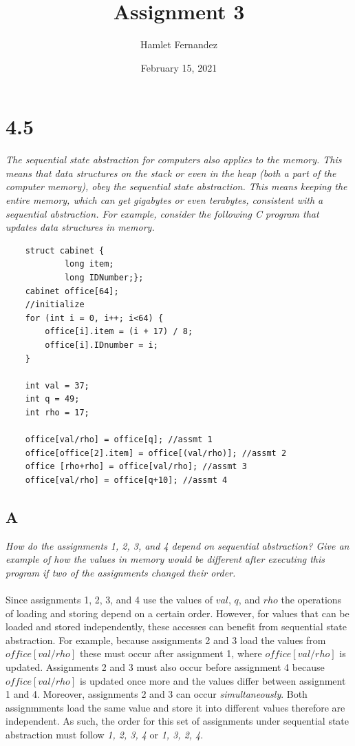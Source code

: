 \documentclass[10pt]{article}
\title{Assignment 3}
\author{Hamlet Fernandez}
\date{February 15, 2021}
\begin{document}
\maketitle{}

\section{4.5}
\textit{The sequential state abstraction for computers also applies to the memory. This
means that data structures on the stack or even in the heap (both a part of the computer
memory), obey the sequential state abstraction. This means keeping the entire memory,
which can get gigabytes or even terabytes, consistent with a sequential abstraction. For
example, consider the following C program that updates data structures in memory.}

\begin{lstlisting}
    struct cabinet {
            long item;
            long IDNumber;};
    cabinet office[64];
    //initialize
    for (int i = 0, i++; i<64) {
        office[i].item = (i + 17) / 8;
        office[i].IDnumber = i;
    }
    
    int val = 37;
    int q = 49;
    int rho = 17;

    office[val/rho] = office[q]; //assmt 1
    office[office[2].item] = office[(val/rho)]; //assmt 2
    office [rho+rho] = office[val/rho]; //assmt 3
    office[val/rho] = office[q+10]; //assmt 4
\end{lstlisting}

\subsection{A}
\textit{How do the assignments 1, 2, 3, and 4 depend on sequential abstraction? Give an
example of how the values in memory would be different after executing this program
if two of the assignments changed their order.}

\paragraph{}Since assignments 1, 2, 3, and 4 use the values of $val$, $q$, and $rho$ the operations of loading and storing
depend on a certain order. However, for values that can be loaded and stored independently, these accesses can benefit from 
sequential state abstraction. For example, because assignments 2 and 3 load the values from $office[val/rho]$ these must occur
after assignment 1, where $office[val/rho]$ is updated. Assignments 2 and 3 must also occur before assignment 4 because $office[val/rho]$
is updated once more and the values differ between assignment 1 and 4. Moreover, assignments 2 and 3 can occur \textit{simultaneously}. Both 
assignmments load the same value and store it into different values therefore are independent. As such, the order for this set of assignments
under sequential state abstraction must follow \textit{1, 2, 3, 4} or \textit{1, 3, 2, 4}. 
\end{document}
